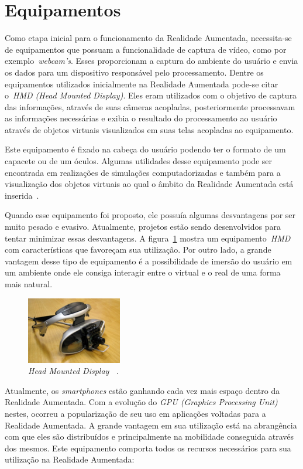 \section{Equipamentos}
\label{sec:equipamentos}

	Como etapa inicial para o funcionamento da Realidade Aumentada, necessita-se de equipamentos que
	possuam a funcionalidade de captura de vídeo, como por exemplo~\textit{webcam's}. Esses
	proporcionam a captura do ambiente do usuário e envia os dados para um dispositivo responsável pelo
	processamento. Dentre os equipamentos utilizados inicialmente na Realidade Aumentada pode-se citar
	o~\textit{HMD (Head Mounted Display)}. Eles eram utilizados com o objetivo de captura das
	informações, através de suas câmeras acopladas, posteriormente processavam as informações
	necessárias e exibia o resultado do processamento ao usuário através de objetos virtuais
	visualizados em suas telas acopladas ao equipamento.
	
	Este equipamento é fixado na cabeça do usuário podendo ter o formato de um capacete ou de um
	óculos. Algumas utilidades desse equipamento pode ser encontrada em realizações de simulações
	computadorizadas e também para a visualização dos objetos virtuais ao qual o âmbito da Realidade
	Aumentada está inserida~\cite{ronaldAzuma}.
		
	Quando esse equipamento foi proposto, ele possuía algumas desvantagens por ser muito pesado e
	evasivo. Atualmente, projetos estão sendo desenvolvidos para tentar minimizar essas desvantagens. A
	figura~\ref{fig:hmd} mostra um equipamento~\textit{HMD} com características que favoreçam sua
	utilização. Por outro lado, a grande vantagem desse tipo de equipamento é a possibilidade de
	imersão do usuário em um ambiente onde ele consiga interagir entre o virtual e o real de uma forma
	mais natural.
	
	\begin{figure}[htb]
		\centering \includegraphics[scale=1.25]{figuras/cap2/hmd.jpg}
		\caption{\textit{Head Mounted Display ~\cite{nilsson}.}}
		\label{fig:hmd} 
	\end{figure}
	
	Atualmente, os \textit{smartphones} estão ganhando cada vez mais espaço dentro da Realidade
	Aumentada. Com a evolução do \textit{GPU (Graphics Processing Unit)} nestes, ocorreu a
	popularização de seu uso em aplicações voltadas para a Realidade Aumentada. A grande vantagem em
	sua utilização está na abrangência com que eles são distribuídos e principalmente na mobilidade
	conseguida através dos mesmos. Este equipamento comporta todos os recursos necessários para sua
	utilização na Realidade Aumentada:
	
